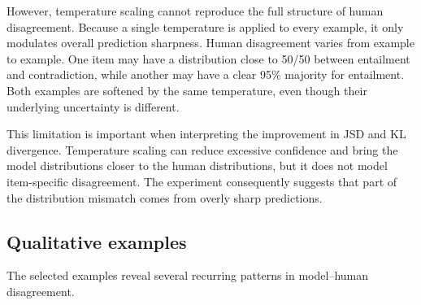\documentclass[11pt,a4paper]{article}
\begin{document}
However, temperature scaling cannot reproduce the full structure of human disagreement. Because a single temperature is applied to every example, it only modulates overall prediction sharpness. Human disagreement varies from example to example. One item may have a distribution close to 50/50 between entailment and contradiction, while another may have a clear 95\% majority for entailment. Both examples are softened by the same temperature, even though their underlying uncertainty is different.

This limitation is important when interpreting the improvement in JSD and KL divergence. Temperature scaling can reduce excessive confidence and bring the model distributions closer to the human distributions, but it does not model item-specific disagreement. The experiment consequently suggests that part of the distribution mismatch comes from overly sharp predictions.

\subsection{Qualitative examples}

The selected examples reveal several recurring patterns in model--human disagreement.
\end{document}
